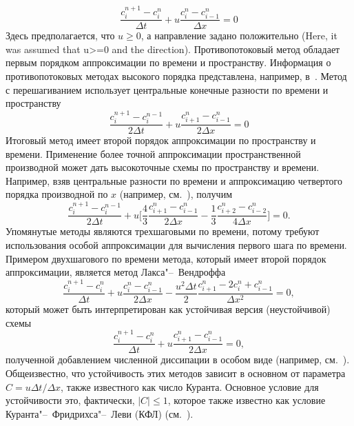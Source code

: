 %
\begin{equation}
\label{eq:equation2_3}
\frac{c_i^{n+1}-c_i^n}{\Delta t} + u\frac{c_i^n-c_{i-1}^{n}}{\Delta x} = 0
\end{equation}
%
Здесь предполагается, что $u\ge0$, а направление задано положительно (Here, it was assumed that u>=0 and the direction). Противопотоковый метод обладает первым порядком аппроксимации по времени и пространству. Информация о противопотоковых методах высокого порядка представлена, например, в~\cite{A12}. Метод с перешагиванием использует центральные конечные разности по времени и пространству
%
\begin{equation}
\label{eq:equation2_4}
\frac{c_i^{n+1}-c_i^{n-1}}{2\Delta t} + u\frac{c_{i+1}^n-c_{i-1}^{n}}{2\Delta x} = 0
\end{equation}
%
Итоговый метод имеет второй порядок аппроксимации по пространству и времени. Применение более точной аппроксимации пространственной производной может дать высокоточные схемы по пространству и времени. Например, взяв центральные разности по времени и аппроксимацию четвертого порядка производной по $x$ (например, см.~\cite{A14}), получим
%
\begin{equation}
\label{eq:equation2_5}
\frac{c_i^{n+1}-c_i^{n-1}}{2\Delta t} + u\Big[\frac{4}{3}\frac{c_{i+1}^n-c_{i-1}^n}{2\Delta x}-\frac{1}{3}\frac{c_{i+2}^n-c_{i-2}^n}{4\Delta x}\Big] = 0.
\end{equation}
%
Упомянутые методы являются трехшаговыми по времени, потому требуют использования особой аппроксимации для вычисления первого шага по времени. Примером двухшагового по времени метода, который имеет второй порядок аппроксимации, является метод Лакса"--~Вендроффа
%
\begin{equation}
\label{eq:equation2_6}
\frac{c_i^{n+1}-c_i^n}{\Delta t} + u\frac{c_i^n-c_{i-1}^n}{2\Delta x} - \frac{u^2\Delta t}{2}\frac{c_{i+1}^n-2c_i^n+c_{i-1}^n}{\Delta x^2} = 0,
\end{equation}
%
который может быть  интерпретирован как устойчивая версия (неустойчивой) схемы
%
\begin{equation}
\label{eq:equation2_7}
\frac{c_i^{n+1}-c_i^n}{\Delta t} + u\frac{c_{i+1}^n-c_{i-1}^n}{2\Delta x} = 0,
\end{equation}
%
полученной добавлением численной диссипации в особом виде (например, см.~\cite{A56}). Общеизвестно, что устойчивость этих методов зависит в основном от параметра $C=u\Delta t/\Delta x$, также известного как число Куранта. Основное условие для устойчивости это, фактически, $\left|C\right|\le1$, которое также известно как условие Куранта"--~Фридрихса"--~Леви (КФЛ) (см.~\cite{A10}).

